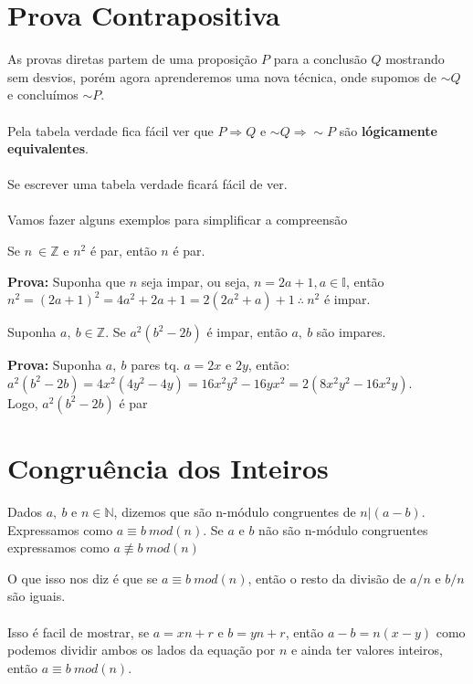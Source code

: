 \documentclass[main.tex]{subfiles}
\begin{document}
\section{Prova Contrapositiva}
As provas diretas partem de uma proposição $P$ para a conclusão $Q$ mostrando sem desvios, porém agora aprenderemos uma nova técnica, onde supomos de $\sim Q$ e concluímos $\sim P$.
\\
\\
Pela tabela verdade fica fácil ver que $P \Rightarrow Q$ e $ \sim Q \Rightarrow \sim P$ são \textbf{lógicamente equivalentes}. \\ \\
Se escrever uma tabela verdade ficará fácil de ver.
\\ \\
Vamos fazer alguns exemplos para simplificar a compreensão
\begin{proposition}
Se $n \ \in  \mathbb{Z}$ e $n^2$ é par, então $n$ é par.
\end{proposition}
\textbf{Prova:} Suponha que $n$ seja impar, ou seja, $n = 2a+1, a \in \mathbb{I}$, então \\ $n^2 = (2a +1)^2 = 4a^2 +2a + 1 = 2(2a^2 + a) + 1 \ \therefore \ n^2$ é impar.
\begin{proposition}
Suponha $a, \ b \in \mathbb{Z}$. Se $a^2(b^2 -2b)$ é impar, então $a, \ b$ são impares.
\end{proposition}
\textbf{Prova:} Suponha $a, \ b$ pares tq. $a = 2x$ e $2y$, então:\\
$a^2(b^2 -2b) = 4x^2(4y^2 - 4y) = 16x^2y^2 -16yx^2 = 2(8x^2y^2 -16x^2y)$.\\
Logo, $a^2(b^2 -2b)$ é par

\section{Congruência dos Inteiros}
\begin{definition}
Dados $a, \ b $ e $n \in \mathbb{N}$, dizemos que são n-módulo congruentes de $n | (a-b)$. Expressamos como $ a \equiv b \ mod(n)$. Se $a$ e $b$ não são n-módulo congruentes expressamos como $a \not\equiv  b \ mod(n)$
\end{definition}
O que isso nos diz é que se $a \equiv b \ mod(n)$, então o resto da divisão de $a/n$ e $b/n$ são iguais. \\ \\
Isso é facil de mostrar, se $a = xn + r$ e $b = yn + r$, então $a-b = n(x-y)$ como podemos dividir ambos os lados da equação por $n$ e ainda ter valores inteiros, então $a \equiv b \ mod(n)$.
\end{document}
